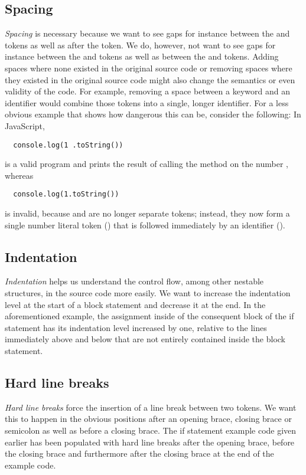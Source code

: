 \subsection{Spacing}
\textit{Spacing} is necessary because we want to see gaps for instance
between the  and \code{==} tokens as well as after the \code{)} token.
We do, however, not want to see gaps for instance
between the \code{(} and  tokens as well as between the  and \code{;} tokens.
Adding spaces where none existed in the original source code
or removing spaces where they existed in the original source code
might also change the semantics or even validity of the code.
For example, removing a space between a keyword and an identifier
would combine those tokens into a single, longer identifier.
For a less obvious example that shows how dangerous this can be, consider the following: In JavaScript,
\begin{verbatim}
  console.log(1 .toString())
\end{verbatim}
is a valid program and prints the result of
calling the method  on the number , whereas
\begin{verbatim}
  console.log(1.toString())
\end{verbatim}
is invalid, because  and  are no longer separate tokens;
instead, they now form a single number literal token ()
that is followed immediately by an identifier ().

\subsection{Indentation}
\textit{Indentation} helps us understand the control flow,
among other nestable structures, in the source code more easily.
We want to increase the indentation level at the start of a block statement and decrease it at the end.
In the aforementioned example, the assignment inside of the consequent block of the if statement
has its indentation level increased by one, relative to the lines immediately above and below
that are not entirely contained inside the block statement.

\subsection{Hard line breaks}
\textit{Hard line breaks} force the insertion of a line break between two tokens.
We want this to happen in the obvious positions
after an opening brace, closing brace or semicolon
as well as before a closing brace.
The if statement example code given earlier has been populated with hard line breaks
after the opening brace, before the closing brace and furthermore
after the closing brace at the end of the example code.

